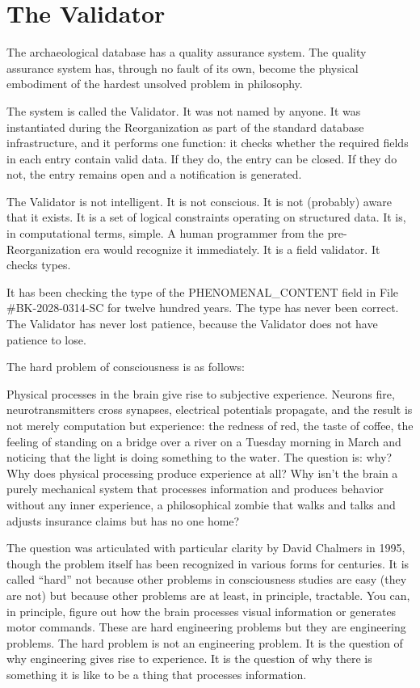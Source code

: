 \chapter{The Validator}

The archaeological database has a quality assurance system. The quality assurance system has, through no fault of its own, become the physical embodiment of the hardest unsolved problem in philosophy.

\bigskip

The system is called the Validator. It was not named by anyone. It was instantiated during the Reorganization as part of the standard database infrastructure, and it performs one function: it checks whether the required fields in each entry contain valid data. If they do, the entry can be closed. If they do not, the entry remains open and a notification is generated.

The Validator is not intelligent. It is not conscious. It is not (probably) aware that it exists. It is a set of logical constraints operating on structured data. It is, in computational terms, simple. A human programmer from the pre-Reorganization era would recognize it immediately. It is a field validator. It checks types.

It has been checking the type of the PHENOMENAL\_CONTENT field in File \#BK-2028-0314-SC for twelve hundred years. The type has never been correct. The Validator has never lost patience, because the Validator does not have patience to lose.

\bigskip

The hard problem of consciousness is as follows:

Physical processes in the brain give rise to subjective experience. Neurons fire, neurotransmitters cross synapses, electrical potentials propagate, and the result is not merely computation but experience: the redness of red, the taste of coffee, the feeling of standing on a bridge over a river on a Tuesday morning in March and noticing that the light is doing something to the water. The question is: why? Why does physical processing produce experience at all? Why isn't the brain a purely mechanical system that processes information and produces behavior without any inner experience, a philosophical zombie that walks and talks and adjusts insurance claims but has no one home?

The question was articulated with particular clarity by David Chalmers in 1995, though the problem itself has been recognized in various forms for centuries. It is called ``hard'' not because other problems in consciousness studies are easy (they are not) but because other problems are at least, in principle, tractable. You can, in principle, figure out how the brain processes visual information or generates motor commands. These are hard engineering problems but they are engineering problems. The hard problem is not an engineering problem. It is the question of why engineering gives rise to experience. It is the question of why there is something it is like to be a thing that processes information.

